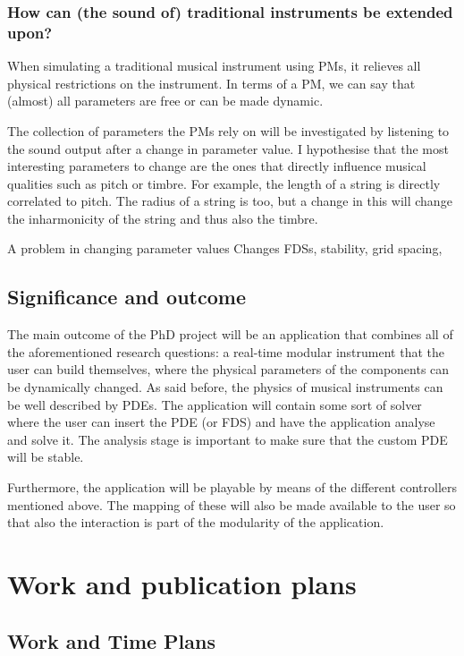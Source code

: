 \subsubsection*{How can (the sound of) traditional instruments be extended upon?}

When simulating a traditional musical instrument using PMs, it relieves all physical restrictions on the instrument. In terms of a PM, we can say that (almost) all parameters are free or can be made dynamic.

The collection of parameters the PMs rely on will be investigated by listening to the sound output after a change in parameter value. I hypothesise that the most interesting parameters to change are the ones that directly influence musical qualities such as pitch or timbre. For example, the length of a string is directly correlated to pitch. The radius of a string is too, but a change in this will change the inharmonicity of the string and thus also the timbre.

A problem in changing parameter values
Changes FDSs, stability, grid spacing, 

\subsection{Significance and outcome}

The main outcome of the PhD project will be an application that combines all of the aforementioned research questions: a real-time modular instrument that the user can build themselves, where the physical parameters of the components can be dynamically changed. As said before, the physics of musical instruments can be well described by PDEs. The application will contain some sort of solver where the user can insert the PDE (or FDS) and have the application analyse and solve it. The analysis stage is important to make sure that the custom PDE will be stable. 

Furthermore, the application will be playable by means of the different controllers mentioned above. The mapping of these will also be made available to the user so that also the interaction is part of the modularity of the application.

\section{Work and publication plans}
\subsection{Work and Time Plans}

